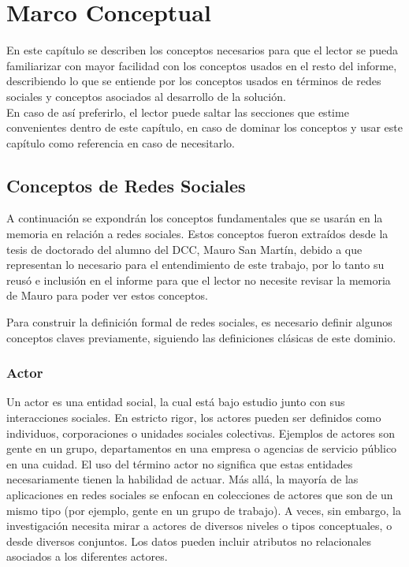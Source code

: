 \chapter{Marco Conceptual}
\label{chap:marco_conceptual}

En este capítulo se describen los conceptos necesarios para que el lector se pueda familiarizar con mayor facilidad con los conceptos usados en el resto del informe, describiendo lo que se entiende por los conceptos usados en términos de redes sociales y conceptos asociados al desarrollo de la solución.\\

En caso de así preferirlo, el lector puede saltar las secciones que estime convenientes dentro de este capítulo, en caso de dominar los conceptos y usar este capítulo como referencia en caso de necesitarlo.

\section{Conceptos de Redes Sociales} %
\label{sec:conceptos_de_redes_sociales}


A continuación se expondrán los conceptos fundamentales que se usarán en la memoria en relación a redes sociales. Estos conceptos fueron extraídos desde la tesis de doctorado del alumno del DCC, Mauro San Martín\cite{tesismauro}, debido a que representan lo necesario para el entendimiento de este trabajo, por lo tanto su reusó e inclusión en el informe para que el lector no necesite revisar la memoria de Mauro para poder ver estos conceptos.

Para construir la definición formal de redes sociales, es necesario definir algunos conceptos claves previamente, siguiendo las definiciones clásicas de este dominio\cite{sna}.

\subsection{Actor} %
\label{sub:actor}
Un actor es una entidad social, la cual está bajo estudio junto con sus interacciones sociales. En estricto rigor, los actores pueden ser definidos como individuos, corporaciones o unidades sociales colectivas. Ejemplos de actores son gente en un grupo, departamentos en una empresa o agencias de servicio público en una cuidad. El uso del término actor no significa que estas entidades necesariamente tienen la habilidad de actuar. Más allá, la mayoría de las aplicaciones en redes sociales se enfocan en colecciones de actores que son de un mismo tipo (por ejemplo, gente en un grupo de trabajo). A veces, sin embargo, la investigación necesita mirar a actores de diversos niveles o tipos conceptuales, o desde diversos conjuntos. Los datos pueden incluir atributos no relacionales asociados a los diferentes actores.

